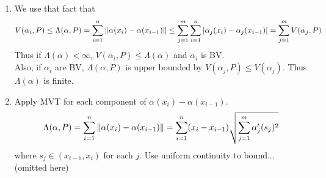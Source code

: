 \begin{enumerate}
	\item We use that fact that $$\begin{aligned}
		 V(\alpha_i, P) \leq \Lambda(\alpha, P) = \sum_{i=1}^n \left\lVert\alpha(x_i) - \alpha(x_{i-1})\right\rVert \leq \sum_{j=1}^m \sum_{i=1}^n \left|\alpha_j (x_i) - \alpha_j(x_{i-1})\right| = \sum_{j=1}^m V(\alpha_j, P)
	\end{aligned}
	$$
	Thus if $\Lambda(\alpha) <\infty$, $V(\alpha_i, P)\leq \Lambda(\alpha)$ and $\alpha_i$ is BV.\\
	Also, if $\alpha_i$ are BV, $\Lambda(\alpha, P)$ is upper bounded by $V(\alpha_j, P) \leq V(\alpha_j)$. Thus $\Lambda(\alpha)$ is finite.
	\item Apply MVT for each component of $\alpha(x_i) - \alpha(x_{i-1})$.
	$$\Lambda(\alpha, P) = \sum_{i=1}^n \left\lVert\alpha(x_i) - \alpha(x_{i-1})\right\rVert = \sum_{i=1}^n (x_i-x_{i-1}) \sqrt{\sum_{j=1}^m \alpha'_j(s_j)^2}$$
	where $s_j \in (x_{i-1}, x_i)$ for each $j$. Use uniform continuity to bound... (omitted here)
\end{enumerate}